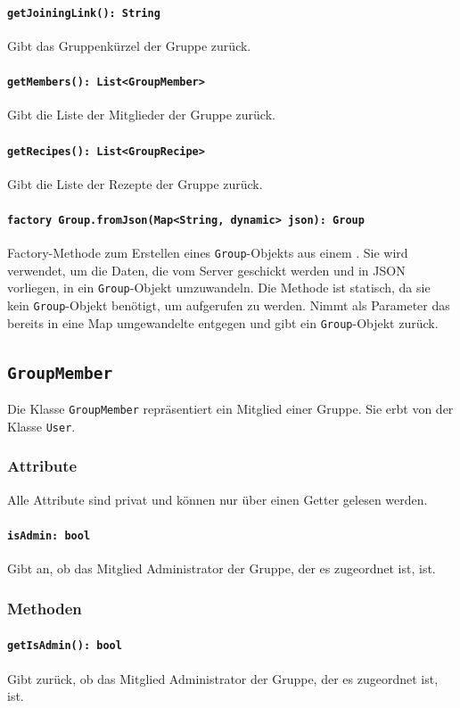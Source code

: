 \documentclass[parskip=full]{scrartcl}
\begin{document}
\paragraph{\texttt{getJoiningLink(): String}}
Gibt das Gruppenkürzel der Gruppe zurück.
\paragraph{\texttt{getMembers(): List<GroupMember>}}
Gibt die Liste der Mitglieder der Gruppe zurück.
\paragraph{\texttt{getRecipes(): List<GroupRecipe>}}
Gibt die Liste der Rezepte der Gruppe zurück.
\paragraph{\texttt{factory Group.fromJson(Map<String, dynamic> json): Group}} Factory-Methode zum Erstellen eines \texttt{Group}-Objekts aus einem . Sie wird verwendet, um die Daten, die vom Server geschickt werden und in \Gls{JSON} vorliegen, in ein \texttt{Group}-Objekt umzuwandeln. Die Methode ist statisch, da sie kein \texttt{Group}-Objekt benötigt, um aufgerufen zu werden. Nimmt als Parameter das bereits in eine Map umgewandelte  entgegen und gibt ein \texttt{Group}-Objekt zurück.

\newpage
\subsection{\texttt{GroupMember}}
Die Klasse \texttt{GroupMember} repräsentiert ein Mitglied einer Gruppe. Sie erbt von der Klasse \texttt{User}.
\subsubsection*{Attribute}
Alle Attribute sind privat und können nur über einen Getter gelesen werden.
\paragraph{\texttt{isAdmin: bool}}
Gibt an, ob das Mitglied Administrator der Gruppe, der es zugeordnet ist, ist.
\subsubsection*{Methoden}
\paragraph{\texttt{getIsAdmin(): bool}}
Gibt zurück, ob das Mitglied Administrator der Gruppe, der es zugeordnet ist, ist.
\end{document}
